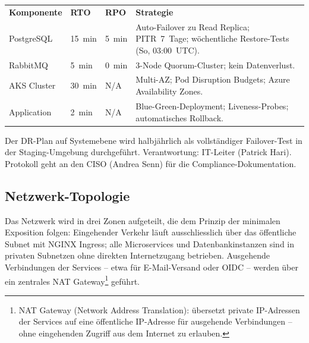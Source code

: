 \begin{tabularx}{\textwidth}{L{3cm} C{1.8cm} C{1.8cm} X}
  \color{white}\textbf{Komponente} & \color{white}\textbf{RTO} & \color{white}\textbf{RPO} & \color{white}\textbf{Strategie} \\
  PostgreSQL & 15~min & 5~min & Auto-Failover zu Read Replica; PITR~7~Tage; wöchentliche Restore-Tests (So, 03:00~UTC). \\
  RabbitMQ & 5~min & 0~min & 3-Node Quorum-Cluster; kein Datenverlust. \\
  AKS Cluster & 30~min & N/A & Multi-AZ; Pod Disruption Budgets; Azure Availability Zones. \\
  Application & 2~min & N/A & Blue-Green-Deployment; Liveness-Probes; automatisches Rollback. \\
\end{tabularx}

\begin{reviewbox}[DR-Testverantwortung]
  Der DR-Plan auf Systemebene wird halbjährlich als vollständiger Failover-Test in der Staging-Umgebung
  durchgeführt. Verantwortung: IT-Leiter (Patrick Hari). Protokoll geht an den CISO (Andrea Senn) für
  die Compliance-Dokumentation.
\end{reviewbox}

\subsection{Netzwerk-Topologie}

Das Netzwerk wird in drei Zonen aufgeteilt, die dem Prinzip der minimalen Exposition
folgen: Eingehender Verkehr läuft ausschliesslich über das öffentliche Subnet mit
NGINX Ingress; alle Microservices und Datenbankinstanzen sind in privaten Subnetzen
ohne direkten Internetzugang betrieben. Ausgehende Verbindungen der Services --
etwa für E-Mail-Versand oder OIDC -- werden über ein zentrales NAT Gateway\footnote{%
NAT Gateway (Network Address Translation): übersetzt private IP-Adressen der Services
auf eine öffentliche IP-Adresse für ausgehende Verbindungen -- ohne eingehenden
Zugriff aus dem Internet zu erlauben.} geführt.

